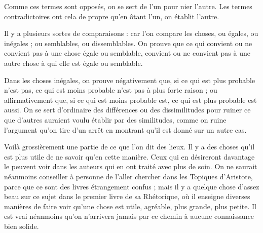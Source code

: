 Comme ces termes sont opposés, on se sert de l'un pour nier l'autre. Les termes contradictoires ont cela de propre qu'en ôtant l'un, on établit l'autre.

Il y a plusieurs sortes de comparaisons : car l'on compare les choses, ou égales, ou inégales ; ou semblables, ou dissemblables. On prouve que ce qui convient ou ne convient pas à une chose égale ou semblable, convient ou ne convient pas à une autre chose à qui elle est égale ou semblable.

Dans les choses inégales, on prouve négativement que, si ce qui est plus probable n'est pas, ce qui est moins probable n'est pas à plus forte raison ; ou affirmativement que, si ce qui est moins probable est, ce qui est plus probable est aussi. On se sert d'ordinaire des différences ou des dissimilitudes pour ruiner ce que d'autres auraient voulu établir par des similitudes, comme on ruine l'argument qu'on tire d'un arrêt en montrant qu'il est donné sur un autre cas.

Voilà grossièrement une partie de ce que l'on dit des lieux. Il y a des choses qu'il est plus utile de ne savoir qu'en cette manière. Ceux qui en désireront davantage le peuvent voir dans les auteurs qui en ont traité avec plus de soin. On ne saurait néanmoins conseiller à personne de l'aller chercher dans les Topiques d'Aristote, parce que ce sont des livres étrangement confus ; mais il y a quelque chose d'assez beau sur ce sujet dans le premier livre de sa Rhétorique, où il enseigne diverses manières de faire voir qu'une chose est utile, agréable, plus grande, plus petite. Il est vrai néanmoins qu'on n'arrivera jamais par ce chemin à aucune connaissance bien solide.

